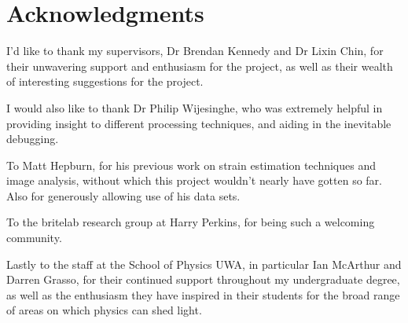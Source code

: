 \chapter*{Acknowledgments}
\thispagestyle{empty}

I'd like to thank my supervisors, Dr Brendan Kennedy and Dr Lixin Chin, for their unwavering support and enthusiasm for the project, as well as their wealth of interesting suggestions for the project. 

I would also like to thank Dr Philip Wijesinghe, who was extremely helpful in providing insight to different processing techniques, and aiding in the inevitable debugging.

To Matt Hepburn, for his previous work on strain estimation techniques and image analysis, without which this project wouldn't nearly have gotten so far. Also for generously allowing use of his data sets. 

To the \ac{britelab} research group at Harry Perkins, for being such a welcoming community. 

Lastly to the staff at the School of Physics UWA, in particular Ian McArthur and Darren Grasso, for their continued support throughout my undergraduate degree, as well as the enthusiasm they have inspired in their students for the broad range of areas on which physics can shed light.
